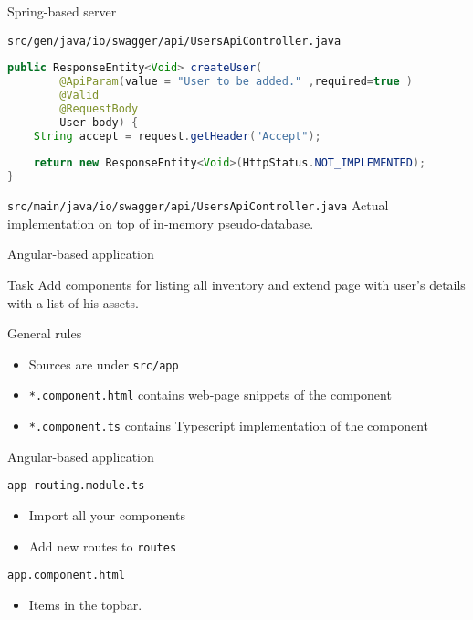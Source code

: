 \begin{frame}[fragile]{Spring-based server}
    \begin{block}{\texttt{src/gen/java/io/swagger/api/UsersApiController.java}}
\begin{lstlisting}[language=Java,style=mini]
public ResponseEntity<Void> createUser(
        @ApiParam(value = "User to be added." ,required=true ) 
        @Valid
        @RequestBody
        User body) {
    String accept = request.getHeader("Accept");
    
    return new ResponseEntity<Void>(HttpStatus.NOT_IMPLEMENTED);
}
\end{lstlisting}
    \end{block}

    \begin{block}{\texttt{src/main/java/io/swagger/api/UsersApiController.java}}
    Actual implementation on top of in-memory pseudo-database.
    \end{block}
\end{frame}


\begin{frame}{Angular-based application}
    \begin{block}{Task}
       Add components for listing all inventory and extend page with
       user's details with a list of his assets.
    \end{block}
    
    \begin{block}{General rules}
        \begin{itemize}
            \item Sources are under \texttt{src/app}
            \item \texttt{*.component.html} contains web-page snippets
                of the component
            \item \texttt{*.component.ts} contains Typescript
                implementation of the component
        \end{itemize}
    \end{block}
\end{frame}

\begin{frame}{Angular-based application}
    \begin{block}{\texttt{app-routing.module.ts}}
        \begin{itemize}
            \item Import all your components
            \item Add new routes to \texttt{routes}
        \end{itemize}
    \end{block}
    
    \begin{block}{\texttt{app.component.html}}
        \begin{itemize}
            \item Items in the topbar.
        \end{itemize}
    \end{block}
\end{frame}


